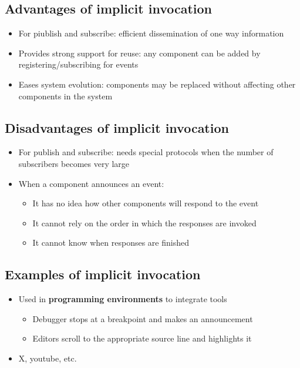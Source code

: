 \documentclass[12pt]{book}
\begin{document}
\subsection{Advantages of implicit invocation}

\begin{itemize}
    \item For piublish and subscribe: efficient dissemination of one way information
    \item Provides strong support for reuse: any component can be added by registering/subscribing for events
    \item Eases system evolution: components may be replaced without affecting other components in the system
\end{itemize}

\subsection{Disadvantages of implicit invocation}

\begin{itemize}
    \item For publish and subscribe: needs special protocols when the number of subscribers becomes very large
    \item When a component announces an event:
    \begin{itemize}
        \item It has no idea how other components will respond to the event
        \item It cannot rely on the order in which the responses are invoked
        \item It cannot know when responses are finished
    \end{itemize}
\end{itemize}

\subsection{Examples of implicit invocation}

\begin{itemize}
    \item Used in \textbf{programming environments} to integrate tools
    \begin{itemize}
        \item Debugger stops at a breakpoint and makes an announcement
        \item Editors scroll to the appropriate source line and highlights it
    \end{itemize} 

    \item X, youtube, etc.
\end{itemize}
\end{document}

